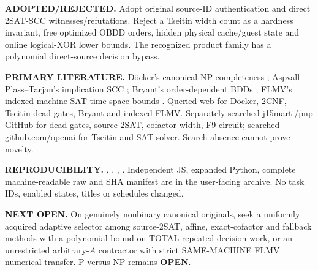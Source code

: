 \documentclass[11pt]{article}
\begin{document}
\noindent\textbf{ADOPTED/REJECTED.}
Adopt original source-ID authentication and direct
2SAT-SCC witnesses/refutations. Reject a Tseitin width
count as a hardness invariant, free optimized OBDD
orders, hidden physical cache/guest state and online
logical-XOR lower bounds. The recognized product family
has a polynomial direct-source decision bypass.

\noindent\textbf{PRIMARY LITERATURE.}
D\"ocker's canonical NP-completeness \cite{doecker2019};
Aspvall--Plass--Tarjan's implication SCC \cite{apt1979};
Bryant's order-dependent BDDs \cite{bryant1986};
FLMV's indexed-machine SAT time-space bounds
\cite{flmv2005}. Queried web for D\"ocker, 2CNF,
Tseitin dead gates, Bryant and indexed FLMV.
Separately searched j15marti/pnp GitHub for
dead gates, source 2SAT, cofactor width, F9 circuit;
searched github.com/openai for Tseitin and SAT solver.
Search absence cannot prove novelty.

\noindent\textbf{REPRODUCIBILITY.}
,
,
,
.
Independent JS, expanded Python, complete machine-readable
raw and SHA manifest are in the user-facing archive.
No task IDs, enabled states, titles or schedules changed.

\noindent\textbf{NEXT OPEN.}
On genuinely nonbinary canonical originals, seek a
uniformly acquired adaptive selector among source-2SAT,
affine, exact-cofactor and fallback methods with a
polynomial bound on TOTAL repeated decision work,
or an unrestricted arbitrary-$A$ contractor with strict
SAME-MACHINE FLMV numerical transfer. P versus NP
remains \textbf{OPEN}.



\end{document}
